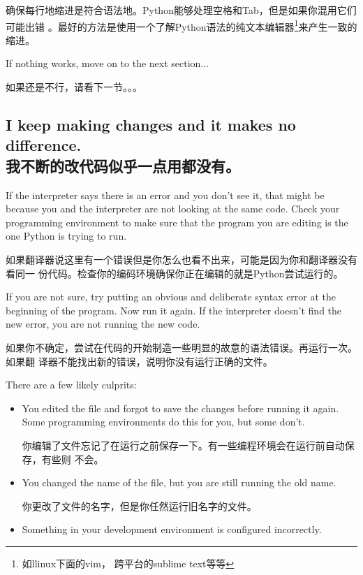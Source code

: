 \documentclass[10pt]{book}
\begin{document}
\begin{CJK}{UTF8}{gbsn}
\begin{enumerate}
确保每行地缩进是符合语法地。Python能够处理空格和Tab，但是如果你混用它们可能出错
。最好的方法是使用一个了解Python语法的纯文本编辑器\footnote{如llinux下面的vim，
跨平台的sublime text等等}来产生一致的缩进。

\end{enumerate}

If nothing works, move on to the next section...

如果还是不行，请看下一节。。。


\subsection{I keep making changes and it makes no difference. \\ 我不断的改代码似乎一点用都没有。}

If the interpreter says there is an error and you don't see it, that
might be because you and the interpreter are not looking at the same
code.  Check your programming environment to make sure that the
program you are editing is the one Python is trying to run.

如果翻译器说这里有一个错误但是你怎么也看不出来，可能是因为你和翻译器没有看同一
份代码。检查你的编码环境确保你正在编辑的就是Python尝试运行的。

If you are not sure, try putting an obvious and deliberate syntax
error at the beginning of the program.  Now run it again.  If the
interpreter doesn't find the new error, you are not running the
new code.

如果你不确定，尝试在代码的开始制造一些明显的故意的语法错误。再运行一次。如果翻
译器不能找出新的错误，说明你没有运行正确的文件。

There are a few likely culprits:

\begin{itemize}

\item You edited the file and forgot to save the changes before
running it again.  Some programming environments do this
for you, but some don't.

你编辑了文件忘记了在运行之前保存一下。有一些编程环境会在运行前自动保存，有些则
不会。

\item You changed the name of the file, but you are still running
the old name.

你更改了文件的名字，但是你任然运行旧名字的文件。

\item Something in your development environment is configured
incorrectly.


\end{itemize}
\end{CJK}
\end{document}
